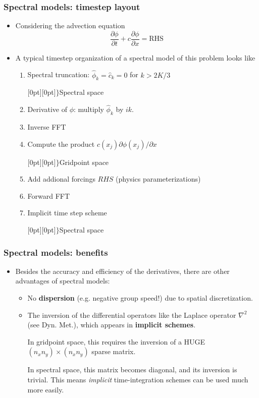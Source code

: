 \documentclass[aspectratio=43,9pt]{beamer}
\begin{document}
%
%
\begin{frame}
	\frametitle{Spectral models: timestep layout}
	\vfill\begin{itemize}
		\item Considering the advection equation
			\begin{equation*}
				\frac{\partial \phi}{\partial t}+c\frac{\partial \phi}{\partial x}=\text{RHS}
			\end{equation*}\vfill
		\item A typical timestep organization of a spectral model of this problem looks like\vfill
			\begin{enumerate}
				\item \parbox{.65\textwidth}{Spectral truncation: $\hat \phi_k = \hat c_k = 0$ for $k>2K/3$}\raisebox{-1.9ex}[0pt][0pt]{$\Bigg\}$\quad Spectral space}
				\item Derivative of $\phi$: multiply $\hat\phi_k$ by $ik$.
				\item Inverse FFT
				\item \parbox{.65\textwidth}{Compute the product $c(x_j) \partial \phi (x_j) / \partial x$}\raisebox{-1.9ex}[0pt][0pt]{$\Bigg\}$\quad Gridpoint space}
				\item Add addional forcings $RHS$ (physics parameterizations)
				\item Forward FFT
				\item \parbox{.65\textwidth}{Implicit time step scheme}\raisebox{0ex}[0pt][0pt]{$\big\}$\quad Spectral space}
			\end{enumerate}
	\end{itemize}\vfill
\end{frame}
%
%
\begin{frame}
	\frametitle{Spectral models: benefits}
	\vfill\begin{itemize}
		\item Besides the accuracy and efficiency of the derivatives, there are other advantages of spectral models:\vfill
		\begin{itemize}
			\item No \textbf{dispersion} (e.g. negative group speed!) due to spatial discretization.\vfill
			\item The inversion of the differential operators like the Laplace operator $\nabla^2$ (see Dyn. Met.), which appears in \textbf{implicit schemes}.\vspace*{2ex}
				\par
				In gridpoint space, this requires the inversion of a HUGE $(n_xn_y)\times(n_xn_y)$ sparse matrix.
				\vspace*{2ex}\par
				In spectral space, this matrix becomes diagonal, and its inversion is trivial. This means \emph{implicit} time-integration schemes can be used much more easily.
		\end{itemize}
	\end{itemize}\vfill
\end{frame}
\end{document}

